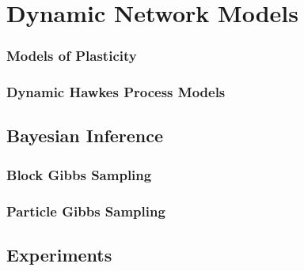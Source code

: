 
\chapter{Dynamic Network Models}

\subsection{Models of Plasticity}

\subsection{Dynamic Hawkes Process Models}

\section{Bayesian Inference}

\subsection{Block Gibbs Sampling}

\subsection{Particle Gibbs Sampling}

\section{Experiments}

